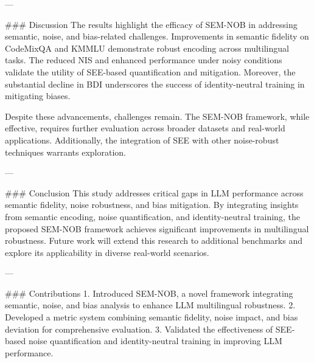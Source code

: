 ---

### Discussion  
The results highlight the efficacy of SEM-NOB in addressing semantic, noise, and bias-related challenges. Improvements in semantic fidelity on CodeMixQA and KMMLU demonstrate robust encoding across multilingual tasks. The reduced NIS and enhanced performance under noisy conditions validate the utility of SEE-based quantification and mitigation. Moreover, the substantial decline in BDI underscores the success of identity-neutral training in mitigating biases.  

Despite these advancements, challenges remain. The SEM-NOB framework, while effective, requires further evaluation across broader datasets and real-world applications. Additionally, the integration of SEE with other noise-robust techniques warrants exploration.  

---

### Conclusion  
This study addresses critical gaps in LLM performance across semantic fidelity, noise robustness, and bias mitigation. By integrating insights from semantic encoding, noise quantification, and identity-neutral training, the proposed SEM-NOB framework achieves significant improvements in multilingual robustness. Future work will extend this research to additional benchmarks and explore its applicability in diverse real-world scenarios.  

---

### Contributions  
1. Introduced SEM-NOB, a novel framework integrating semantic, noise, and bias analysis to enhance LLM multilingual robustness.  
2. Developed a metric system combining semantic fidelity, noise impact, and bias deviation for comprehensive evaluation.  
3. Validated the effectiveness of SEE-based noise quantification and identity-neutral training in improving LLM performance.  

